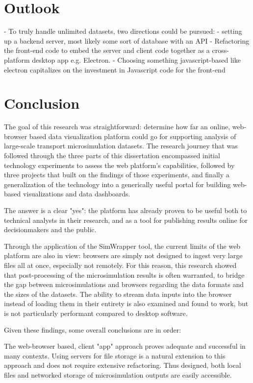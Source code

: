 
\section{Outlook}
\label{08-conclusions-outlook}

- To truly handle unlimited datasets, two directions could be pursued:
  - setting up a backend server, most likely some sort of database with an API
  - Refactoring the front-end code to embed the server and client code together as a cross-platform desktop app e.g. Electron.
  - Choosing something javascript-based like electron capitalizes on the investment in Javascript code for the front-end

\section{Conclusion}
\label{08-conclusions-conclusion}

The goal of this research was straightforward: determine how far an online, web-browser based data visualization platform could go for supporting analysis of large-scale transport microsimulation datasets. The research journey that was followed through the three parts of this dissertation encompassed initial technology experiments to assess the web platform's capabilities, followed by three projects that built on the findings of those experiments, and finally a generalization of the technology into a generically useful portal for building web-based visualizations and data dashboards.

The answer is a clear "yes": the platform has already proven to be useful both to technical analysts in their research, and as a tool for publishing results online for decisionmakers and the public.

Through the application of the SimWrapper tool, the current limits of the web platform are also in view: browsers are simply not designed to ingest very large files all at once, especially not remotely. For this reason, this research showed that post-processing of the microsimulation results is often warranted, to bridge the gap between microsimulations and browsers regarding the data formats and the sizes of the datasets. The ability to stream data inputs into the browser instead of loading them in their entirety is also examined and found to work, but is not particularly performant compared to desktop software.

Given these findings, some overall conclusions are in order:

The web-browser based, client "app" approach proves adequate and successful in many contexts. Using servers for file storage is a natural extension to this approach and does not require extensive refactoring. Thus designed, both local files and networked storage of microsimulation outputs are easily accessible.

